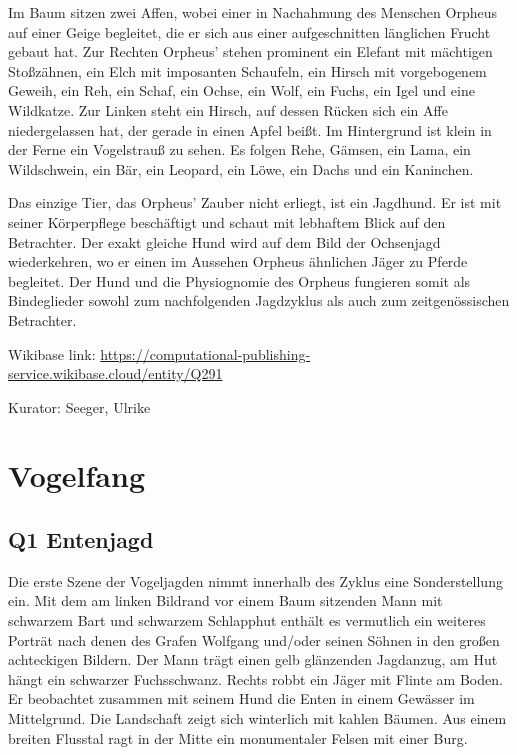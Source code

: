 \documentclass[
  letterpaper,
]{book}
\begin{document}
Im Baum sitzen zwei Affen, wobei einer in Nachahmung des Menschen
Orpheus auf einer Geige begleitet, die er sich aus einer aufgeschnitten
länglichen Frucht gebaut hat. Zur Rechten Orpheus' stehen prominent ein
Elefant mit mächtigen Stoßzähnen, ein Elch mit imposanten Schaufeln, ein
Hirsch mit vorgebogenem Geweih, ein Reh, ein Schaf, ein Ochse, ein Wolf,
ein Fuchs, ein Igel und eine Wildkatze. Zur Linken steht ein Hirsch, auf
dessen Rücken sich ein Affe niedergelassen hat, der gerade in einen
Apfel beißt. Im Hintergrund ist klein in der Ferne ein Vogelstrauß zu
sehen. Es folgen Rehe, Gämsen, ein Lama, ein Wildschwein, ein Bär, ein
Leopard, ein Löwe, ein Dachs und ein Kaninchen.

Das einzige Tier, das Orpheus' Zauber nicht erliegt, ist ein Jagdhund.
Er ist mit seiner Körperpflege beschäftigt und schaut mit lebhaftem
Blick auf den Betrachter. Der exakt gleiche Hund wird auf dem Bild der
Ochsenjagd wiederkehren, wo er einen im Aussehen Orpheus ähnlichen Jäger
zu Pferde begleitet. Der Hund und die Physiognomie des Orpheus fungieren
somit als Bindeglieder sowohl zum nachfolgenden Jagdzyklus als auch zum
zeitgenössischen Betrachter.

Wikibase link:
\url{https://computational-publishing-service.wikibase.cloud/entity/Q291}

Kurator: Seeger, Ulrike


\chapter{Vogelfang}\label{vogelfang}

\section{Q1 Entenjagd}\label{q1-entenjagd}

Die erste Szene der Vogeljagden nimmt innerhalb des Zyklus eine
Sonderstellung ein. Mit dem am linken Bildrand vor einem Baum sitzenden
Mann mit schwarzem Bart und schwarzem Schlapphut enthält es vermutlich
ein weiteres Porträt nach denen des Grafen Wolfgang und/oder seinen
Söhnen in den großen achteckigen Bildern. Der Mann trägt einen gelb
glänzenden Jagdanzug, am Hut hängt ein schwarzer Fuchsschwanz. Rechts
robbt ein Jäger mit Flinte am Boden. Er beobachtet zusammen mit seinem
Hund die Enten in einem Gewässer im Mittelgrund. Die Landschaft zeigt
sich winterlich mit kahlen Bäumen. Aus einem breiten Flusstal ragt in
der Mitte ein monumentaler Felsen mit einer Burg.
\end{document}

